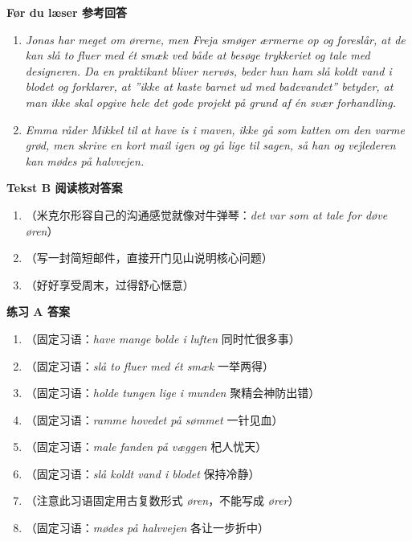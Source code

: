 \begin{answerbox}
\textbf{Før du læser 参考回答}
\begin{enumerate}
  \item \textit{Jonas har meget om ørerne, men Freja smøger ærmerne op og foreslår, at de kan slå to fluer med ét smæk ved både at besøge trykkeriet og tale med designeren. Da en praktikant bliver nervøs, beder hun ham slå koldt vand i blodet og forklarer, at ”ikke at kaste barnet ud med badevandet” betyder, at man ikke skal opgive hele det gode projekt på grund af én svær forhandling.}
  \item \textit{Emma råder Mikkel til at have is i maven, ikke gå som katten om den varme grød, men skrive en kort mail igen og gå lige til sagen, så han og vejlederen kan mødes på halvvejen.}
\end{enumerate}

\textbf{Tekst B 阅读核对答案}
\begin{enumerate}
  \item {}（米克尔形容自己的沟通感觉就像对牛弹琴：\textit{det var som at tale for døve øren}）
  \item {}（写一封简短邮件，直接开门见山说明核心问题）
  \item {}（好好享受周末，过得舒心惬意）
\end{enumerate}

\textbf{练习 A 答案}
\begin{enumerate}
  \item {}（固定习语：\textit{have mange bolde i luften} 同时忙很多事）
  \item {}（固定习语：\textit{slå to fluer med ét smæk} 一举两得）
  \item {}（固定习语：\textit{holde tungen lige i munden} 聚精会神防出错）
  \item {}（固定习语：\textit{ramme hovedet på sømmet} 一针见血）
  \item {}（固定习语：\textit{male fanden på væggen} 杞人忧天）
  \item {}（固定习语：\textit{slå koldt vand i blodet} 保持冷静）
  \item {}（注意此习语固定用古复数形式 \textit{øren}，不能写成 \textit{ører}）
  \item {}（固定习语：\textit{mødes på halvvejen} 各让一步折中）
\end{enumerate}


\end{answerbox}
